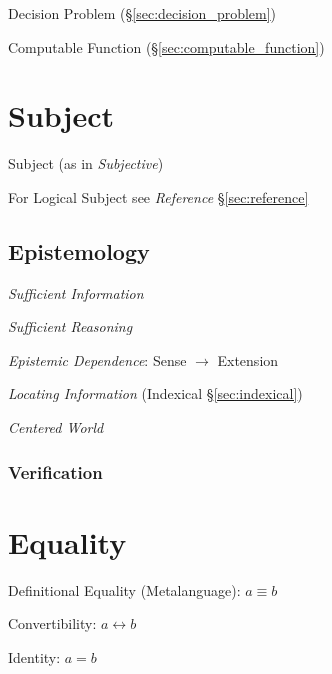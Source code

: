 Decision Problem (\S\ref{sec:decision_problem})

Computable Function (\S\ref{sec:computable_function})



\section{Subject}\label{sec:subject}

Subject (as in \emph{Subjective})

For Logical Subject see \emph{Reference} \S\ref{sec:reference}



\subsection{Epistemology}\label{sec:epistemology}
\cite{chalmers02}

\emph{Sufficient Information}

\emph{Sufficient Reasoning}

\emph{Epistemic Dependence}: Sense $\rightarrow$ Extension

\emph{Locating Information} (Indexical \S\ref{sec:indexical})

\emph{Centered World}



\subsubsection{Verification}\label{sec:verification}



\section{Equality}\label{sec:equality}\cite{baez15}

Definitional Equality (Metalanguage): $a \equiv b$

Convertibility: $a \leftrightarrow b$

Identity: $a = b$

